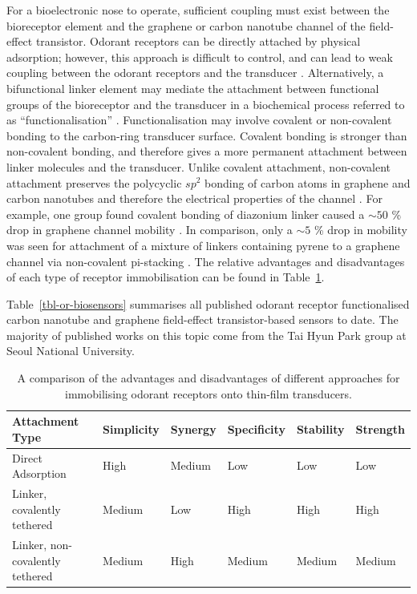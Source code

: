 \documentclass[
  a4paper,
]{scrbook}
\begin{document}
For a bioelectronic nose to operate, sufficient coupling must exist
between the bioreceptor element and the graphene or carbon nanotube
channel of the field-effect transistor. Odorant receptors can be
directly attached by physical adsorption; however, this approach is
difficult to control, and can lead to weak coupling between the odorant
receptors and the transducer \autocite{Kwon2015,Dung2018,Bohbot2020}.
Alternatively, a bifunctional linker element may mediate the attachment
between functional groups of the bioreceptor and the transducer in a
biochemical process referred to as ``functionalisation''
\autocite{Star2003a}. Functionalisation may involve covalent or
non-covalent bonding to the carbon-ring transducer surface. Covalent
bonding is stronger than non-covalent bonding, and therefore gives a
more permanent attachment between linker molecules and the transducer.
Unlike covalent attachment, non-covalent attachment preserves the
polycyclic \(sp^2\) bonding of carbon atoms in graphene and carbon
nanotubes and therefore the electrical properties of the channel
\autocite{DiCrescenzo2014,Yao2021,Shkodra2021,Li2023}. For example, one
group found covalent bonding of diazonium linker caused a \(\sim 50\) \%
drop in graphene channel mobility \autocite{Lerner2014}. In comparison,
only a \(\sim 5\) \% drop in mobility was seen for attachment of a
mixture of linkers containing pyrene to a graphene channel via
non-covalent pi-stacking \autocite{Thodkar2021}. The relative advantages
and disadvantages of each type of receptor immobilisation can be found
in Table~\ref{tbl-functionalisation-types}.

Table~\ref{tbl-or-biosensors} summarises all published odorant receptor
functionalised carbon nanotube and graphene field-effect
transistor-based sensors to date. The majority of published works on
this topic come from the Tai Hyun Park group at Seoul National
University.

\hypertarget{tbl-functionalisation-types}{}
\begin{longtable}[t]{>{\raggedright\arraybackslash}p{5.4cm}>{\raggedright\arraybackslash}p{1.45cm}>{\raggedright\arraybackslash}p{1.3cm}>{\raggedright\arraybackslash}p{1.45cm}>{\raggedright\arraybackslash}p{1.3cm}>{\raggedright\arraybackslash}p{1.3cm}}
\caption{\label{tbl-functionalisation-types}A comparison of the advantages and disadvantages of different approaches
for immobilising odorant receptors onto thin-film transducers. }\tabularnewline

\toprule
Attachment Type & Simplicity & Synergy & Specificity & Stability & Strength\\
\midrule
Direct Adsorption & High & Medium & Low & Low & Low\\
Linker, covalently tethered & Medium & Low & High & High & High\\
Linker, non-covalently tethered & Medium & High & Medium & Medium & Medium\\
\bottomrule
\end{longtable}
\end{document}
